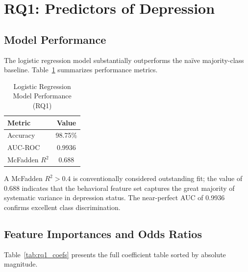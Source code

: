 \documentclass[11pt]{article}
\begin{document}
\section{RQ1: Predictors of Depression}
\label{sec:rq1}

\subsection{Model Performance}

The logistic regression model substantially outperforms the na\"ive majority-class baseline.
Table~\ref{tab:rq1_model} summarizes performance metrics.

\begin{table}[H]
\centering
\caption{Logistic Regression Model Performance (RQ1)}
\label{tab:rq1_model}
\begin{tabular}{lc}
\toprule
\textbf{Metric} & \textbf{Value} \\
\midrule
Accuracy & 98.75\% \\
AUC-ROC & 0.9936 \\
McFadden $R^2$ & 0.688 \\
\bottomrule
\end{tabular}
\end{table}

A McFadden $R^2 > 0.4$ is conventionally considered outstanding fit; the value of 0.688
indicates that the behavioral feature set captures the great majority of systematic variance
in depression status.  The near-perfect AUC of 0.9936 confirms excellent class discrimination.

\subsection{Feature Importances and Odds Ratios}

Table~\ref{tab:rq1_coefs} presents the full coefficient table sorted by absolute magnitude.
\end{document}

